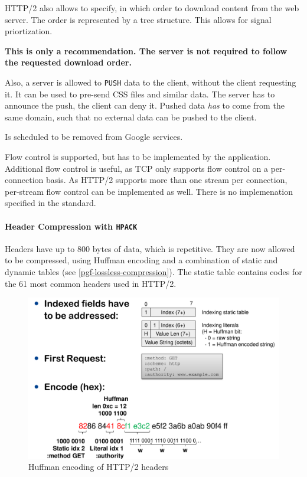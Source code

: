 \documentclass[english]{panikzettel}
\newcommand{\alert}[1]{\textbf{\textcolor{red!75!black}{#1}}}
\begin{document}
	HTTP/2 also allows to specify, in which order to download content from the web server. The order is represented by a tree structure. This allows for signal priortization. 

	\alert{This is only a recommendation. The server is not required to follow the requested download order.}

	Also, a server is allowed to \texttt{PUSH} data to the client, without the client requesting it. It can be used to pre-send CSS files and similar data. The server has to announce the push, the client can deny it. Pushed data \textit{has} to come from the same domain, such that no external data can be pushed to the client.

	Is scheduled to be removed from Google services.

	Flow control is supported, but has to be implemented by the application. 
	Additional flow control is useful, as TCP only supports flow control on a per-connection basis. 
	As HTTP/2 supports more than one stream per connection, per-stream flow control can be implemented as well.
	There is no implemenation specified in the standard.

	\paragraph{Header Compression with \texttt{HPACK}}
	\label{pgf-header-compression}
	
	Headers have up to 800 bytes of data, which is repetitive. 
	They are now allowed to be compressed, using Huffman encoding and a combination of static and dynamic tables (see \cref{pgf-lossless-compression}).
	The static table contains codes for the 61 most common headers used in HTTP/2.	
	
	\begin{figure}[H]
		\centering
		\includegraphics[width=\textwidth]{img/2-http2-huffman.png}
		\caption{Huffman encoding of HTTP/2 headers}
		\label{img-2-http2-huffman}
	\end{figure}	
\end{document}
